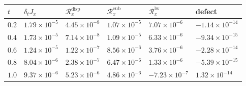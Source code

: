 \begin{tabular}{llllll}
\toprule
$t$ & $\delta_t J_{x}$ & $\mathcal{R}^{\mathrm{disp}}_x$ & $\mathcal{R}^{\mathrm{cub}}_x$ & $\mathcal{R}^{\mathrm{lw}}_x$ & defect \\
\midrule
\(0.2\) & \(1.79\times10^{-5}\) & \(4.45\times10^{-8}\) & \(1.07\times10^{-5}\) & \(7.07\times10^{-6}\) & \(-1.14\times10^{-14}\) \\
\(0.4\) & \(1.73\times10^{-5}\) & \(7.14\times10^{-8}\) & \(1.09\times10^{-5}\) & \(6.33\times10^{-6}\) & \(-9.34\times10^{-15}\) \\
\(0.6\) & \(1.24\times10^{-5}\) & \(1.22\times10^{-7}\) & \(8.56\times10^{-6}\) & \(3.76\times10^{-6}\) & \(-2.28\times10^{-14}\) \\
\(0.8\) & \(8.04\times10^{-6}\) & \(2.38\times10^{-7}\) & \(6.47\times10^{-6}\) & \(1.33\times10^{-6}\) & \(-5.39\times10^{-15}\) \\
\(1.0\) & \(9.37\times10^{-6}\) & \(5.23\times10^{-6}\) & \(4.86\times10^{-6}\) & \(-7.23\times10^{-7}\) & \(1.32\times10^{-14}\) \\
\bottomrule
\end{tabular}
